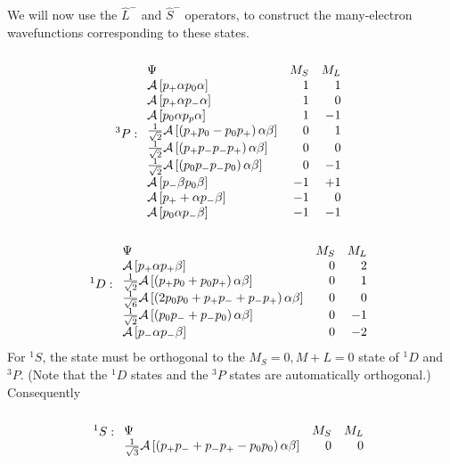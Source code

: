 We will now use the ${\hat L}^-$ and ${\hat S}^-$ operators, to 
construct the many-electron wavefunctions corresponding to these states.
\begin{equation}
^3P : 
\begin{array}{lrr}\\
\Psi & M_S & M_L \\
{\cal A} \left[ p_+ \alpha p_0 \alpha \right] & 1 & 1 \\
{\cal A} \left[ p_+ \alpha p_- \alpha \right] & 1 & 0 \\
{\cal A} \left[ p_0 \alpha  p_p \alpha \right]& 1 & -1\\
{1 \over \sqrt{2}} {\cal A} \left[ \left( p_+ p_0 
- p_0 p_+ \right) \alpha \beta \right] & 0 & 1 \\
{1 \over \sqrt{2}} {\cal A} \left[ \left( p_+ p_
- p_- p_+ \right) \alpha \beta \right]& 0 & 0 \\
{1 \over \sqrt{2}} {\cal A} \left[ \left( p_0 p_-
p_- p_0 \right) \alpha \beta \right]& 0 & -1\\
{\cal A} \left[ p_- \beta p_0 \beta \right] &-1 & +1\\
{\cal A} \left[ p_+ + \alpha p_- \beta \right]&-1 & 0 \\
{\cal A} \left[ p_0 \alpha p_- \beta \right]&-1 & -1\\
\end{array}
\label{chap5app-eqno7}
\end{equation}
\begin{equation}
{^1D} : 
\begin{array}{lrr}\\
\Psi & M_S & M_L \\
{\cal A} \left[ p_+ \alpha p_+ \beta \right] & 0 &  2 \\
{1 \over \sqrt{2}} {\cal A} \left[ \left( p_+ p_0 
+ p_0 p_+ \right) \alpha \beta \right] & 0 &  1 \\
{1 \over \sqrt{6}} {\cal A} \left[ \left( 2 p_0 p_0 
+ p_+ p_- + p_- p_+ \right) \alpha \beta \right] & 0 &  0 \\
{1 \over \sqrt{2}} {\cal A} \left[ \left( p_0 p_- 
+ p_- p_0 \right) \alpha \beta \right] & 0 &  -1\\
{\cal A} \left[ p_- \alpha p_- \beta \right]& 0 &  -2\\
\end{array}
\end{equation}
For ${^1S}$, the state must be orthogonal to the $M_S = 0, M + L = 0$ 
state of ${^1D}$ and ${^3P}$.  (Note that the ${^1D}$ states and the 
${^3P}$ states are automatically orthogonal.)  Consequently
\begin{equation}
{^1S} : 
\begin{array}{lrr}\\
\Psi & M_S & M_L \\
{1 \over \sqrt{3}} {\cal A} \left[ \left( p_+ 
p_- + p_- p_+ - p_0 p_0 \right) \alpha \beta \right] &0& 0\\
\end{array}
\end{equation}

